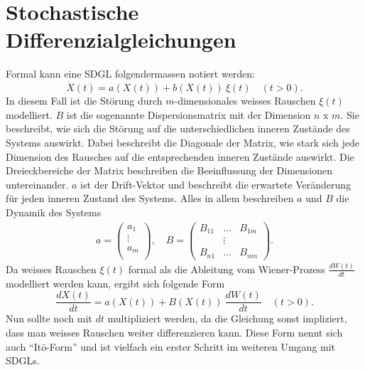 %
%
%
%

\section{Stochastische Differenzialgleichungen\label{brown:SDGL}}

Formal kann eine SDGL folgendermassen notiert werden: 
\begin{equation}
	\label{brown:SDGL:whiteNoise}
	\dot{X}(t) = a(X(t)) + b(X(t)) \ \xi(t) \quad (t>0).
\end{equation}
In diesem Fall ist die Störung durch $ m $-dimensionales weisses Rauschen $ \xi(t) $ modelliert. $ B $ ist die sogenannte Dispersionsmatrix mit der Dimension $ n $ x $ m $. Sie beschreibt, wie sich die Störung auf die unterschiedlichen inneren Zustände des Systems auswirkt. Dabei beschreibt die Diagonale der Matrix, wie stark sich jede Dimension des Rausches auf die entsprechenden inneren Zustände auswirkt. Die Dreieckbereiche der Matrix beschreiben die Beeinflussung der Dimensionen untereinander. $ a $ ist der Drift-Vektor und beschreibt die erwartete Veränderung für jeden inneren Zustand des Systems. Alles in allem beschreiben $ a $ und $ B $ die Dynamik des Systems
\begin{align*}
	a = 
	\begin{pmatrix}
		a_{1} \\
		\vdots \\
		a_{m}\\ 
	\end{pmatrix}
	, \quad
	B = 
	\begin{pmatrix}
		B_{11} & \dots & B_{1m} \\
		& \vdots & \\
		B_{n1} & \dots & B_{nm} 
	\end{pmatrix}.
\end{align*}
Da weisses Rauschen $ \xi(t) $ formal als die Ableitung vom Wiener-Prozess $ \frac{dW(t)}{dt} $ modelliert werden kann, ergibt sich folgende Form
\begin{equation}
	\frac{dX(t)}{dt} = a(X(t)) + B(X(t)) \ \frac{dW(t)}{dt} \quad (t>0).
\end{equation}
Nun sollte noch mit $ dt $  multipliziert werden, da die Gleichung sonst impliziert, dass man weisses Rauschen weiter differenzieren kann. Diese Form nennt sich auch ``Itō-Form'' und ist vielfach ein erster Schritt im weiteren Umgang mit SDGLs.
